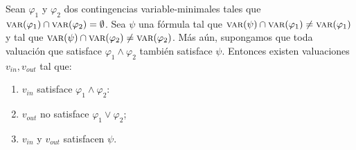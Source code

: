 \begin{theorem}\label{theorem:TeoremaPrincipal}
Sean $\varphi_1$ y $\varphi_2$ dos contingencias variable-minimales tales que $\textsc{var}(\varphi_1)\cap \textsc{var}(\varphi_2) = \emptyset$. Sea $\psi$ una fórmula tal que $\textsc{var}(\psi) \cap \textsc{var}(\varphi_1) \neq \textsc{var}(\varphi_1)$ y tal que $\textsc{var}(\psi) \cap \textsc{var}(\varphi_2) \neq \textsc{var}(\varphi_2)$.  Más aún, supongamos que toda valuación que satisface $\varphi_1 \land \varphi_2$ también satisface  $\psi$. Entonces existen valuaciones $v_{in}, v_{out}$ tal que:
\begin{enumerate}
    \item \label{item:v1EnInterseccion} $v_{in}$ satisface $\varphi_1 \land \varphi_2$:    
    \item $v_{out}$ no satisface $\varphi_1 \lor \varphi_2$; 
    
    \item $v_{in}$ y $v_{out}$ satisfacen $\psi$.
\end{enumerate}
\end{theorem}
